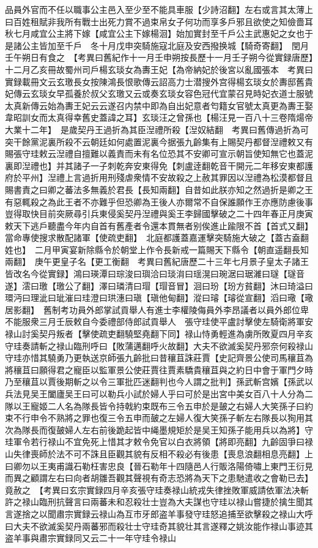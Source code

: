 品員外官而不任以職事公主邑入至少至不能具車服【少詩沼翻】左右或言其太薄上曰百姓租賦非我所有戰士出死力賞不過束帛女子何功而享多戶邪且欲使之知儉嗇耳秋七月咸宜公主將下嫁【咸宜公主下嫁楊洄】始加實封至千戶公主武惠妃之女也于是諸公主皆加至千戶　冬十月戊申突騎施寇北庭及安西撥换城【騎奇寄翻】　閏月壬午朔日有食之　【考異曰舊紀作十一月壬申朔按長歷十一月壬子朔今從實録唐歷】　十二月乙亥冊故蜀州司戶楊玄琰女為夀王妃【為帝納妃於後宮以亂國張本　考異曰實録載冊文云玄璬長女按陳鴻長恨歌傳云詔高力士潜搜外宫得楊玄琰女於夀邸舊貴妃傳云玄琰女早孤養於叔父玄璬又云或奏玄琰女容色冠代宜蒙召見時妃衣道士服號太真新傳云始為夀王妃云云遂召内禁中即為自出妃意者匄籍女官號太真更為夀王娶韋昭訓女而太真得幸舊史蓋諱之耳】玄琰汪之曾孫也【楊汪見一百八十三卷隋煬帝大業十二年】　是歲契丹王過折為其臣湼禮所殺【湼奴結翻　考異曰舊傳過折為可突干餘黨泥裏所殺不云朝廷如何處置泥裏今据張九齡集有上賜契丹都督湼禮敕又有賜張守珪敕云湼禮自擅難以義責而未有名位恐其不安卿可宣示朝旨使知無它也蓋泥裏即湼禮也】并其諸子一子刺乾奔安東得免【刺盧逹翻乾音干開元二年移安東都護府於平州】湼禮上言過折用刑殘虐衆情不安故殺之上赦其罪因以湼禮為松漠都督且賜書責之曰卿之蕃法多無義於君長【長知兩翻】自昔如此朕亦知之然過折是卿之王有惡輒殺之為此王者不亦難乎但恐卿為王後人亦爾常不自保誰願作王亦應防慮後事豈得取快目前突厥尋引兵東侵奚契丹湼禮與奚王李歸國擊破之二十四年春正月庚寅敕天下逃戶聽盡今年内自首有舊產者令還本貫無者别俟進止踰限不首【首式又翻】當命專使搜求散配諸軍【使疏吏翻】　北庭都護蓋嘉運擊突騎施大破之【蓋古盍翻姓也】　二月甲寅宴新除縣令於朝堂上作令長新戒一篇賜天下縣令【朝直遥翻長知兩翻】　庚午更皇子名【更工衡翻　考異曰舊紀唐歷二十三年七月景子皇太子諸王皆改名今從實録】鴻曰瑛潭曰琮浚曰璵洽曰琰㳙曰瑶滉曰琬涺曰琚濰曰璲【璲音遂】澐曰璬【璬公了翻】澤曰璘清曰瑁【瑁音冒】洄曰玢【玢方貧翻】沐曰琦溢曰環沔曰理泚曰玼漼曰珪澄曰珙潓曰瑱【瑱他甸翻】漎曰璿【璿從宣翻】滔曰璥【璥居影翻】　舊制考功員外郎掌試貢舉人有進士李權陵侮員外李昂議者以員外郎位卑不能服衆三月壬辰敕自今委禮部侍郎試貢舉人　張守珪使平盧討擊使左騎衛將軍安禄山討奚契丹叛者【擊使疏吏翻驍堅堯翻下同】禄山恃勇輕進為虜所敗夏四月辛亥守珪奏請斬之禄山臨刑呼曰【敗蒲邁翻呼火故翻】大夫不欲滅奚契丹邪奈何殺禄山守珪亦惜其驍勇乃更執送京師張九齡批曰昔穰苴誅莊賈【史記齊景公使司馬穰苴為將穰苴曰願得君之寵臣以監軍景公使莊賈往賈素驕貴穰苴與之約日中會于軍門夕時乃至穰苴以賈後期斬之以令三軍批匹迷翻判也今人謂之批判】孫武斬宫嬪【孫武以兵法見吴王闔廬吴王曰可以勒兵小試於婦人乎曰可於是出宮中美女百八十人分為二隊以王寵姬二人名為隊長皆令持戟約束既布三令五申於是皷之右婦人大笑孫子曰約束不行申令不熟將之罪也復三令五申而皷之左婦人復大笑孫子斬左右隊長以狥用其次為隊長而復皷婦人左右前後跪起皆中䋲墨規矩於是吴王知孫子能用兵以為將】守珪軍令若行禄山不宜免死上惜其才敕令免官以白衣將領【將即亮翻】九齡固爭曰禄山失律喪師於法不可不誅且臣觀其貌有反相不殺必有後患【喪息浪翻相息亮翻】上曰卿勿以王夷甫識石勒枉害忠良【晉石勒年十四隨邑人行販洛陽倚嘯上東門王衍見而異之顧謂左右曰向者胡雛吾觀其聲視有奇志恐將為天下之患馳遣收之會勒已去】竟赦之　【考異曰玄宗實録四月辛亥張守珪奏禄山統戎失律挫敗軍威請依軍法决斬許之禄山臨刑抗聲言曰兩蕃未和忍殺壮士豈為大夫謀也守珪以禄山嘗捷於擒生聞其言遂捨之以聞肅宗實録云禄山為互市牙郎盗羊事發守珪怒追捕至欲擊殺之禄山大呼曰大夫不欲滅奚契丹兩蕃邪而殺壮士守珪奇其貌壮其言遂釋之姚汝能作禄山事迹其盗羊事與肅宗實録同又云二十一年守珪令禄山